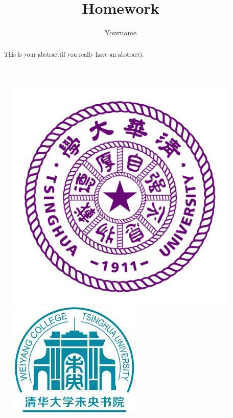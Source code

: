 \documentclass[a4paper,11pt]{ctexart}
\title{\Huge\textbf{Homework}}
\author{Yourname}
\begin{document}
\maketitle

\begin{figure}[b]
    \centering
\begin{minipage}[t]{0.48\textwidth}
    \centering
    \includegraphics[scale=0.6]{logo.png}    
\end{minipage}
\begin{minipage}[t]{0.48\textwidth}
    \centering
    \includegraphics[scale=1.55]{wy.jpg}    
\end{minipage}

\end{figure}

\newpage
\begin{abstract}
    This is your abstract(if you really have an abstract). 
\end{abstract}
\newpage
    \tableofcontents
\end{document}
